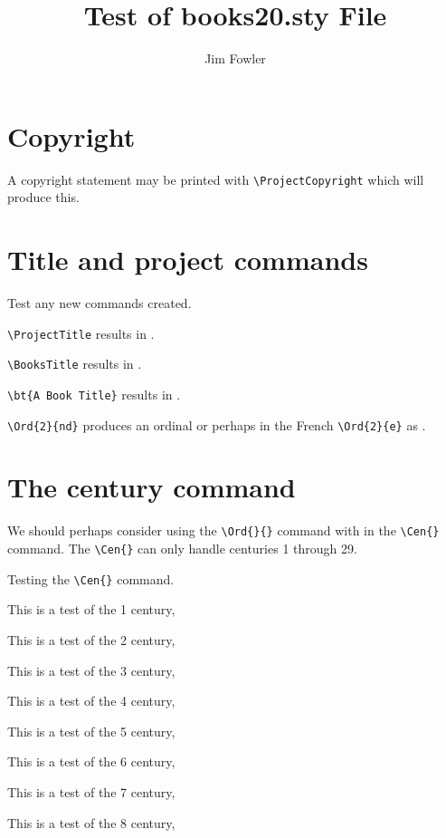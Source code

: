 \documentclass{article}
\begin{document}
\title{Test of books20.sty File}
\author{Jim Fowler}

\maketitle

\section{Copyright}

A copyright statement may be printed with \verb|\ProjectCopyright|
which will produce this.
\vspace{\baselineskip}


\section{Title and project commands}

Test any new commands created.

\verb|\ProjectTitle| results in \ProjectTitle.

\verb|\BooksTitle| results in \BookTitle.

\verb|\bt{A Book Title}| results in .

\verb|\Ord{2}{nd}| produces an ordinal  or perhaps
in the French \verb|\Ord{2}{e}| as .

\section{The century command}

We should perhaps consider using the \verb|\Ord{}{}| command with in
the \verb|\Cen{}| command.  The \verb|\Cen{}| can only handle
centuries 1 through 29.

Testing the \verb|\Cen{}| command.

This is a test of the 1 century, 

This is a test of the 2 century, 

This is a test of the 3 century, 

This is a test of the 4 century, 

This is a test of the 5 century, 

This is a test of the 6 century, 

This is a test of the 7 century, 

This is a test of the 8 century, 
\end{document}
